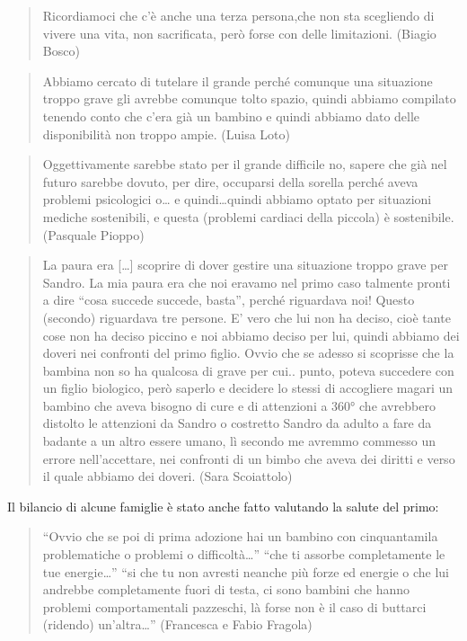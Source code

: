 \documentclass[12pt,oneside,svgnames]{memoir}
\newenvironment{quotationb}%
{\color{maincolor}\begin{leftbar}\begin{quotation}}%
{\end{quotation}\end{leftbar}\ignorespacesafterend}
\begin{document}
\begin{quotationb}
Ricordiamoci che c'è anche una terza persona,che non sta scegliendo di
vivere una vita, non sacrificata, però forse con delle limitazioni.
(Biagio Bosco)
\end{quotationb}

\begin{quotationb}
Abbiamo cercato di tutelare il grande perché comunque una situazione
troppo grave gli avrebbe comunque tolto spazio, quindi abbiamo compilato
tenendo conto che c'era già un bambino e quindi abbiamo dato delle
disponibilità non troppo ampie. (Luisa Loto)
\end{quotationb}

\begin{quotationb}
Oggettivamente sarebbe stato per il grande difficile no, sapere che già
nel futuro sarebbe dovuto, per dire, occuparsi della sorella perché
aveva problemi psicologici o\ldots{} e quindi\ldots{}quindi abbiamo
optato per situazioni mediche sostenibili, e questa (problemi cardiaci
della piccola) è sostenibile. (Pasquale Pioppo)
\end{quotationb}

\begin{quotationb}
La paura era {[}\ldots{}{]} scoprire di dover gestire una situazione
troppo grave per Sandro. La mia paura era che noi eravamo nel primo caso
talmente pronti a dire ``cosa succede succede, basta'', perché
riguardava noi! Questo (secondo) riguardava tre persone. E' vero che lui
non ha deciso, cioè tante cose non ha deciso piccino e noi abbiamo
deciso per lui, quindi abbiamo dei doveri nei confronti del primo
figlio. Ovvio che se adesso si scoprisse che la bambina non so ha
qualcosa di grave per cui.. punto, poteva succedere con un figlio
biologico, però saperlo e decidere lo stessi di accogliere magari un
bambino che aveva bisogno di cure e di attenzioni a 360° che avrebbero
distolto le attenzioni da Sandro o costretto Sandro da adulto a fare da
badante a un altro essere umano, lì secondo me avremmo commesso un
errore nell'accettare, nei confronti di un bimbo che aveva dei diritti e
verso il quale abbiamo dei doveri. (Sara Scoiattolo)
\end{quotationb}

Il bilancio di alcune famiglie è stato anche fatto valutando la salute
del primo:

\begin{quotationb}
``Ovvio che se poi di prima adozione hai un bambino con cinquantamila
problematiche o problemi o difficoltà\ldots{}'' ``che ti assorbe
completamente le tue energie\ldots{}'' ``si che tu non avresti neanche
più forze ed energie o che lui andrebbe completamente fuori di testa, ci
sono bambini che hanno problemi comportamentali pazzeschi, là forse non
è il caso di buttarci (ridendo) un'altra\ldots{}'' (Francesca e Fabio
Fragola)
\end{quotationb}
\end{document}
